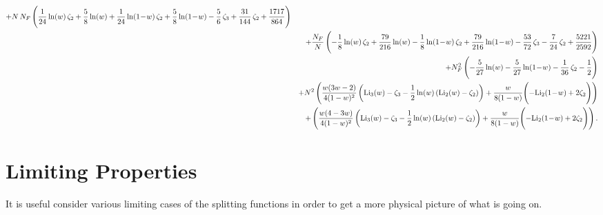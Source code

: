 \documentclass[paper,notoc,nohyper]{JHEP3}
\def\NF{N_F}
\def\lx{\ln(w)}
\def\ly{\ln(1\!-\!w)}
\def\Libx{{\rm Li}_2(w)}
\def\Licx{{\rm Li}_3(w)}
\def\Liby{{\rm Li}_2(1\!-\!w)}
\def\AAAXXX{\Licx-\zeta_3-\frac{1}{2}\lx\left(\Libx-\zeta_2\right)}
\def\AAAYYY{-\Liby+2\zeta_2}
\begin{document}
\begin{eqnarray}
+{N}\,{\NF}\,\Biggl ({1\over 24}\,{\lx}\,{\zeta_2}+{5\over 8}\,{\lx}+{1\over 24}\,{\ly}\,{\zeta_2}+{5\over 8}\,{\ly}-{5\over 6}\,{\zeta_3}+{31\over 144}\,{\zeta_2}+{1717\over 864}\Biggr )\nonumber \\&&
+{\NF\over N}\, \Biggl (-{1\over 8}\,{\lx}\,{\zeta_2}+{79\over 216}\,{\lx}-{1\over 8}\,{\ly}\,{\zeta_2}+{79\over 216}\,{\ly}-{53\over 72}\,{\zeta_3}-{7\over 24}\,{\zeta_2}+{5221\over 2592}\Biggr )\nonumber \\&&
+{\NF^2}\,\Biggl (-{5\over 27}\,{\lx}-{5\over 27}\,{\ly}-{1\over 36}\,{\zeta_2}-{1\over 2}\Biggr )\nonumber \\&&
+N^2\left(\frac{w(3w-2)}{4(1-w)^2}\left(\AAAXXX\right)
+\frac{w}{8(1-w)}\Biggl(\AAAYYY\Biggr)\right)\nonumber \\&&
+\left(\frac{w(4-3w)}{4(1-w)^2}\left(\AAAXXX\right)
+\frac{w}{8(1-w)}\Biggl(\AAAYYY\Biggr)\right).
\end{eqnarray}

\section{Limiting Properties}
\label{sec:limits}

It is useful consider various limiting cases of the splitting functions in
order to get a more physical picture of what is going on. 
\end{document}
